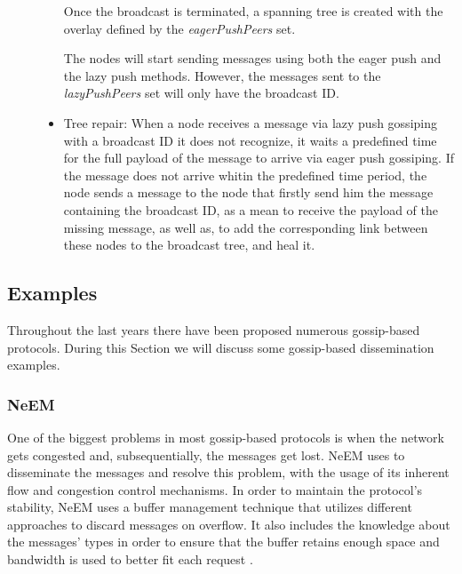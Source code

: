 \begin{description}
\begin{itemize}
                        Once the broadcast is terminated, a spanning tree is created with the
                        overlay defined by the \textit{eagerPushPeers} set.

                        The nodes will start sending messages using both the eager push and the
                        lazy push methods. However, the messages sent to the \textit{lazyPushPeers}
                        set will only have the broadcast ID.
                  \item Tree repair: When a node receives a message via lazy push gossiping
                        with a broadcast ID it does not recognize, it waits a predefined time
                        for the full payload of the message to arrive via eager push gossiping.
                        If the message does not arrive whitin the predefined time period, the
                        node sends a message to the node that firstly send him the message
                        containing the broadcast ID, as a mean to receive the payload of the
                        missing message, as well as, to add the corresponding link between
                        these nodes to the broadcast tree, and heal it.
            \end{itemize}
\end{description}


\subsection{Examples}
\label{subsec:gossip_examples}
Throughout the last years there have been proposed numerous gossip-based protocols. During
this Section we will discuss some gossip-based dissemination examples.

\subsubsection{\Gls{NeEM}}
\label{subsubsec:gossip_examples_neem}
One of the biggest problems in most gossip-based protocols is when the
network gets congested and, subsequentially, the messages get lost. NeEM
uses  to disseminate the messages and resolve this problem, with the
usage of its inherent flow and congestion control mechanisms. In order to maintain
the protocol's stability, NeEM uses a buffer management technique that
utilizes different approaches to discard messages on overflow. It also includes the
knowledge about the messages' types in order to ensure that the buffer retains enough
space and bandwidth is used to better fit each request \cite{Pereira2003}. %

